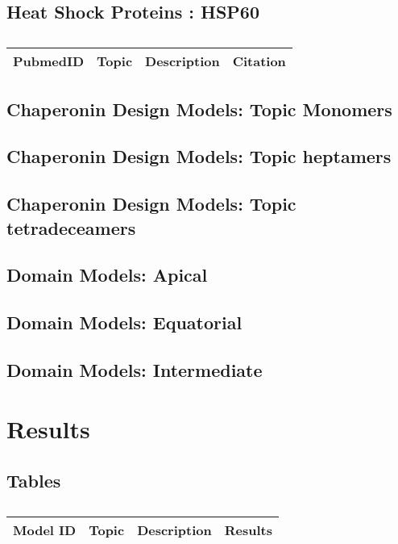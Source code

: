 \subsection{Heat Shock Proteins : HSP60}

\centering	
\begin{table}[H]\tiny
	\caption{}	
	\begin{tabular}{rp{1cm}|p{4cm}|l}
		\hline	
		PubmedID & Topic & Description & Citation \\
		\hline 
		\hline 
	\end{tabular}
\end{table}

\subsection{Chaperonin Design Models: Topic Monomers} 
\subsection{Chaperonin Design Models: Topic heptamers}
\subsection{Chaperonin Design Models: Topic tetradeceamers}

\subsection{Domain Models: Apical}
\subsection{Domain Models: Equatorial}
\subsection{Domain Models: Intermediate}


\section{Results}


\subsection{Tables}

\centering	
\begin{table}[H]\tiny
	\caption{}	
	\begin{tabular}{rp{1cm}|p{4cm}|l}
		\hline	
		Model ID & Topic & Description & Results \\
		\hline 
		\hline 
	\end{tabular}
\end{table}

